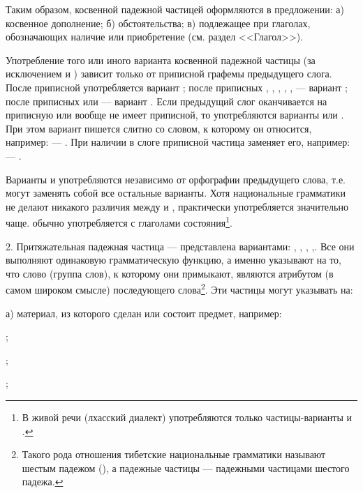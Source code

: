Таким образом, косвенной падежной частицей оформляются в предложении: а) косвенное дополнение; б) обстоятельства; в) подлежащее при глаголах, обозначающих наличие или приобретение (см. раздел <<Глагол>>).

Употребление того или иного варианта косвенной падежной частицы (за исключением  и ) зависит только от приписной графемы предыдущего слога. После приписной  употребляется вариант ; после приписных , , , , ,  --- вариант  ; после приписных  или  --- вариант . Если предыдущий слог оканчивается на приписную  или вообще не имеет приписной, то употребляются варианты  или . При этом вариант  пишется слитно со словом, к которому он относится, например:  --- . При наличии в слоге приписной  частица  заменяет его, например:  --- .

Варианты  и  употребляются независимо от орфографии предыдущего слова, т.е. могут заменять собой все остальные варианты. Хотя национальные грамматики не делают никакого различия между  и , практически  употребляется значительно чаще.  обычно употребляется с глаголами состояния\footnote[45]{В живой речи (лхасский диалект) употребляются только частицы-варианты  и .}.

\label{04_06_ppch}2. Притяжательная падежная частица --- представлена вариантами: , , , ,. Все они выполняют одинаковую грамматическую функцию, а именно указывают на то, что слово (группа слов), к которому они примыкают, являются атрибутом (в самом широком смысле) последующего слова\footnote[46]{Такого рода отношения тибетские национальные грамматики называют шестым падежом (), а падежные частицы --- падежными частицами шестого падежа.}.
Эти частицы могут указывать на:

а) материал, из которого сделан или состоит предмет, например:
\begin{prfsample}
	\item {};
	\item {};
	\item {};
\end{prfsample}

